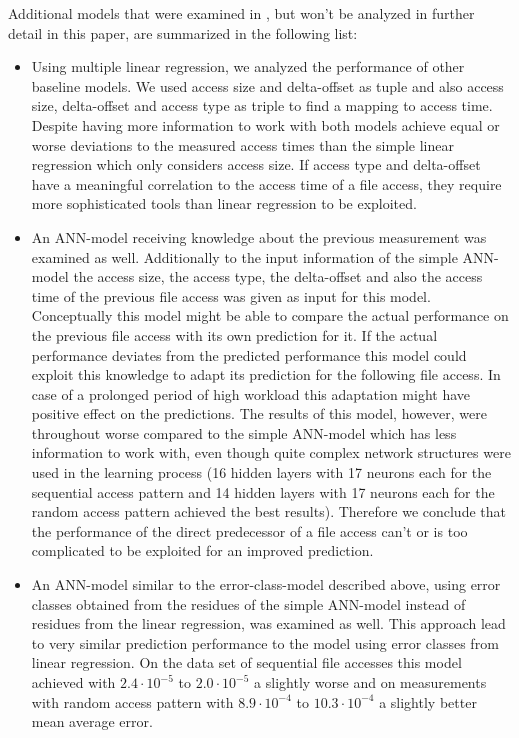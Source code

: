 \documentclass{superfri}
\begin{document}
	Additional models that were examined in \cite{VVEIHUDVVN15}, but won't be analyzed in further detail in this paper, are summarized in the following list:
	\begin{itemize}
		\item Using multiple linear regression, we analyzed the performance of other baseline models. We used access size and delta-offset as tuple and also access size, delta-offset and access type as triple to find a mapping to access time.
		Despite having more information to work with both models achieve equal or worse deviations to the measured access times than the simple linear regression which only considers access size.
		If access type and delta-offset have a meaningful correlation to the access time of a file access, they require more sophisticated tools than linear regression to be exploited.
		\item An ANN-model receiving knowledge about the previous measurement was examined as well.
		Additionally to the input information of the simple ANN-model the access size, the access type, the delta-offset and also the access time of the previous file access was given as input for this model.
		Conceptually this model might be able to compare the actual performance on the previous file access with its own prediction for it. If the actual performance deviates from the predicted performance this model could exploit this knowledge to adapt its prediction for the following file access. In case of a prolonged period of high workload this adaptation might have positive effect on the predictions.
		The results of this model, however, were throughout worse compared to the simple ANN-model which has less information to work with, even though quite complex network structures were used in the learning process (16 hidden layers with 17 neurons each for the sequential access pattern and 14 hidden layers with 17 neurons each for the random access pattern achieved the best results).
		Therefore we conclude that the performance of the direct predecessor of a file access can't or is too complicated to be exploited for an improved prediction.
		\item An ANN-model similar to the error-class-model described above, using error classes obtained from the residues of the simple ANN-model instead of residues from the linear regression, was examined as well. This approach lead to very similar prediction performance to the model using error classes from linear regression. On the data set of sequential file accesses this model achieved with $2.4\cdot10^{-5}$ to $2.0\cdot10^{-5}$ a slightly worse and on measurements with random access pattern with  $8.9\cdot10^{-4}$ to $10.3\cdot10^{-4}$ a slightly better mean average error.
	\end{itemize}
	
\end{document}
